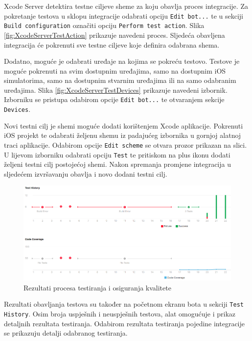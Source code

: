 \documentclass[times, utf8, diplomski, numeric]{fer}
\begin{document}
Xcode Server detektira testne ciljeve sheme za koju obavlja proces integracije. Za pokretanje testova u sklopu integracije odabrati opciju \verb|Edit bot...| te u sekciji \verb|Build configuration| označiti opciju \verb|Perform test action|. Slika \ref{fig:XcodeServerTestAction} prikazuje navedeni proces. Sljedeća obavljena integracija će pokrenuti sve testne ciljeve koje definira odabrana shema.

Dodatno, moguće je odabrati uređaje na kojima se pokreću testovo. Testove je moguće pokrenuti na svim dostupnim uređajima, samo na dostupnim iOS simulatorima, samo na dostupnim stvarnim uređajima ili na samo odabranim uređajima. Slika \ref{fig:XcodeServerTestDevices} prikazuje navedeni izbornik. Izborniku se pristupa odabirom opcije \verb|Edit bot...| te otvaranjem sekcije \verb|Devices|.

Novi testni cilj je shemi moguće dodati korištenjem Xcode aplikacije. Pokrenuti iOS projekt te odabrati željenu shemu iz padajućeg izbornika u gornjoj alatnoj traci aplikacije. Odabirom opcije \verb|Edit scheme| se otvara prozor prikazan na slici. U lijevom izborniku odabrati opciju \verb|Test| te pritiskom na plus ikonu dodati željeni testni cilj postojećoj shemi. Nakon spremanja promjene integracija u sljedećem izvršavanju obavlja i novo dodani testni cilj.

\begin{figure}[b!]
\centering
\includegraphics[scale=0.4]{XcodeServerTestResult}
\caption{Rezultati procesa testiranja i osiguranja kvalitete}
\label{fig:XcodeServerTestResult}
\end{figure}

Rezultati obavljanja testova su također na početnom ekranu bota u sekciji \verb|Test History|. Osim broja uspješnih i neuspješnih testova, alat omogućuje i prikaz detaljnih rezultata testiranja. Odabirom rezultata testiranja pojedine integracije se prikazuju detalji odabranog testiranja.
\end{document}
